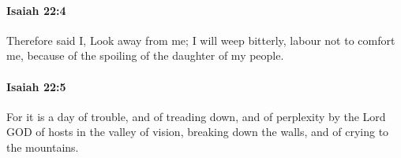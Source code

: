 		\paragraph{Isaiah 22:4} %
			\label{ISAIAH-22-4}

			Therefore said I, Look away from me; I will weep bitterly, labour not to comfort me, because of the spoiling of the daughter of my people.


		\paragraph{Isaiah 22:5} %
			\label{ISAIAH-22-5}

			For it is a day of trouble, and of treading down, and of perplexity by the Lord GOD of hosts in the valley of vision, breaking down the walls, and of crying to the mountains.


